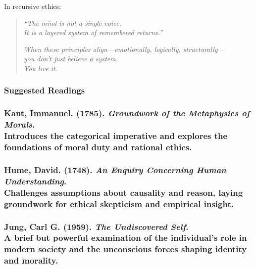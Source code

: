 In recursive ethics:

\begin{quote}
\emph{``The mind is not a single voice.\\
It is a layered system of remembered returns.''}

\emph{When these principles align---emotionally, logically,
structurally---\\
you don't just believe a system.\\
You live it.}
\end{quote}

\subsubsection{\texorpdfstring{\textbf{Suggested
Readings}}{Suggested Readings}}\label{suggested-readings}

\subsubsection{\texorpdfstring{\textbf{Kant, Immanuel.} (1785).
\emph{Groundwork of the Metaphysics of Morals}.\\
Introduces the categorical imperative and explores the foundations of
moral duty and rational
ethics.}{Kant, Immanuel. (1785). Groundwork of the Metaphysics of Morals. Introduces the categorical imperative and explores the foundations of moral duty and rational ethics.}}\label{kant-immanuel.-1785.-groundwork-of-the-metaphysics-of-morals.-introduces-the-categorical-imperative-and-explores-the-foundations-of-moral-duty-and-rational-ethics.}

\subsubsection{\texorpdfstring{\textbf{Hume, David.} (1748). \emph{An
Enquiry Concerning Human Understanding}.\\
Challenges assumptions about causality and reason, laying groundwork for
ethical skepticism and empirical
insight.}{Hume, David. (1748). An Enquiry Concerning Human Understanding. Challenges assumptions about causality and reason, laying groundwork for ethical skepticism and empirical insight.}}\label{hume-david.-1748.-an-enquiry-concerning-human-understanding.-challenges-assumptions-about-causality-and-reason-laying-groundwork-for-ethical-skepticism-and-empirical-insight.}

\subsubsection{\texorpdfstring{\textbf{Jung, Carl G.} (1959). \emph{The
Undiscovered Self}.\\
A brief but powerful examination of the individual's role in modern
society and the unconscious forces shaping identity and
morality.}{Jung, Carl G. (1959). The Undiscovered Self. A brief but powerful examination of the individual's role in modern society and the unconscious forces shaping identity and morality.}}\label{jung-carl-g.-1959.-the-undiscovered-self.-a-brief-but-powerful-examination-of-the-individuals-role-in-modern-society-and-the-unconscious-forces-shaping-identity-and-morality.}

